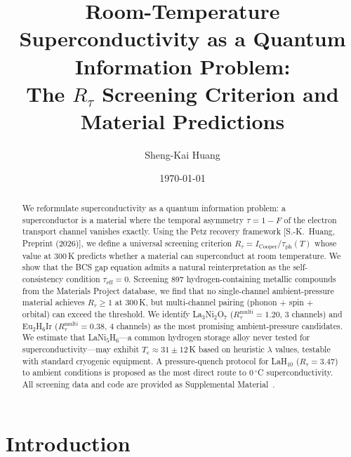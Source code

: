 \documentclass[prb,twocolumn,superscriptaddress,longbibliography,floatfix]{revtex4-2}
\newcommand{\tauasym}{\tau}
\newcommand{\taueff}{\tauasym_{\mathrm{eff}}}
\newcommand{\taudec}{\tauasym_{\mathrm{ph}}}
\newcommand{\Icoop}{I_{\mathrm{Cooper}}}
\newcommand{\Rtau}{R_{\tauasym}}
\newcommand{\Tc}{T_{\mathrm{c}}}
\begin{document}
\title{Room-Temperature Superconductivity as a Quantum Information Problem:\\
The $R_\tau$ Screening Criterion and Material Predictions}

\author{Sheng-Kai Huang}

\date{\today}

\begin{abstract}
We reformulate superconductivity as a quantum information problem:
a superconductor is a material where the temporal asymmetry
$\tauasym = 1 - F$ of the electron transport channel vanishes exactly.
Using the Petz recovery framework [S.-K.\ Huang, Preprint (2026)],
we define a universal screening criterion
$\Rtau = \Icoop / \taudec(T)$ whose value at $300\,$K predicts
whether a material can superconduct at room temperature.
We show that the BCS gap equation admits a natural
reinterpretation as the self-consistency condition $\taueff = 0$.
Screening 897 hydrogen-containing metallic compounds from the
Materials Project database, we find that no single-channel
ambient-pressure material achieves $\Rtau \geq 1$ at $300\,$K,
but multi-channel pairing (phonon $+$ spin $+$ orbital) can
exceed the threshold.  We identify La$_3$Ni$_2$O$_7$
($\Rtau^{\mathrm{multi}} = 1.20$, 3 channels) and
Eu$_2$H$_6$Ir ($\Rtau^{\mathrm{multi}} = 0.38$, 4 channels)
as the most promising ambient-pressure candidates.
We estimate that LaNi$_5$H$_6$---a common hydrogen storage alloy
never tested for superconductivity---may exhibit
$\Tc \approx 31 \pm 12\,$K based on heuristic $\lambda$ values,
testable with standard cryogenic equipment.
A pressure-quench protocol for LaH$_{10}$
($\Rtau = 3.47$) to ambient conditions is proposed as
the most direct route to $0\,^\circ$C superconductivity.
All screening data and code are provided as Supplemental
Material~\cite{supplement}.
\end{abstract}

\maketitle

\section{Introduction}
\label{sec:intro}
\end{document}
